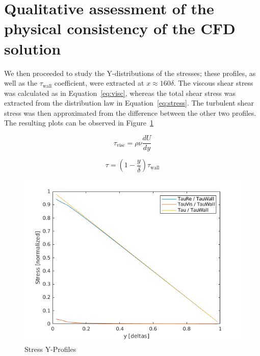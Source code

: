 \documentclass[12pt]{article}
\begin{document}
\section{Qualitative assessment of the physical consistency of the CFD solution} \label{sec:qualitative}

        We then proceeded to study the Y-distributions of the stresses; these profiles, as well as the \( \tau_{\text{wall}} \) coefficient, were extracted at \(x \approx 160 \delta\). The viscous shear stress was calculated as in Equation~\ref{eq:visc}, whereas the total shear stress was extracted from the distribution law in Equation~\ref{eq:stress}. The turbulent shear stress was then approximated from the difference between the other two profiles. The resulting plots can be observed in Figure~\ref{fig:stress}

        \begin{equation} \label{eq:visc}
                \tau_{\text{visc}} = \rho \nu \frac{dU}{dy}
        \end{equation}

        \begin{equation} \label{eq:stress}
                \tau = (1 - \frac{y}{\delta}) \tau_{\text{wall}}
        \end{equation}

        \begin{figure}[ht!]
                \centering
                \includegraphics[width=\textwidth]{stress.png}
                \caption{Stress Y-Profiles}
                \label{fig:stress}
        \end{figure}
\end{document}
